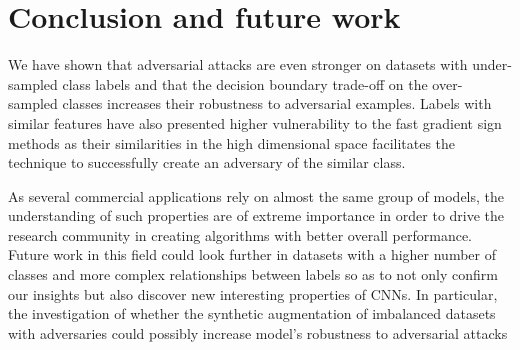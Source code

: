\documentclass[runningheads,a4paper]{llncs}
\begin{document}
\section{Conclusion and future work}

We have shown that adversarial attacks are even stronger on datasets with under-sampled class labels and that the decision boundary trade-off on the over-sampled classes increases their robustness to adversarial examples. Labels with similar features have also presented higher vulnerability to the fast gradient sign methods as their similarities in the high dimensional space facilitates the technique to successfully create an adversary of the similar class. 

As several commercial applications rely on almost the same group of models, the understanding of such properties are of extreme importance in order to drive the research community in creating algorithms with better overall performance. Future work in this field could look further in datasets with a higher number of classes and more complex relationships between labels so as to not only confirm our insights but also discover new interesting properties of CNNs. In particular, the investigation of whether the synthetic augmentation of imbalanced datasets with adversaries could possibly increase model's robustness to adversarial attacks


 

\end{document}
